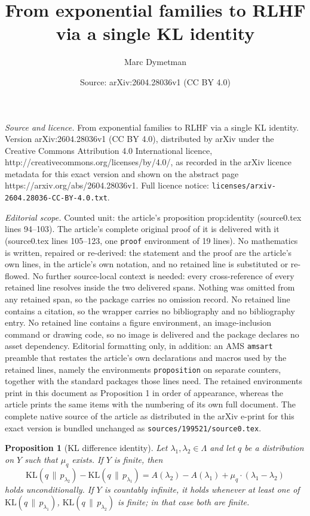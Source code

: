\documentclass[10pt,a4paper]{amsart}
\title{From exponential families to RLHF via a single KL identity}
\author{Marc Dymetman}
\date{Source: arXiv:2604.28036v1 (CC BY 4.0)}
\newtheorem{proposition}{Proposition}
\newcommand{\KL}[2]{\mathrm{KL}\!\left(#1 \,\|\, #2\right)}
\begin{document}
\maketitle

\noindent\emph{Source and licence.} From exponential families to RLHF via a single KL identity. Version arXiv:2604.28036v1 (CC BY 4.0), distributed by arXiv under the Creative Commons Attribution 4.0 International licence, http://creativecommons.org/licenses/by/4.0/, as recorded in the arXiv licence metadata for this exact version and shown on the abstract page https://arxiv.org/abs/2604.28036v1. Full licence notice: \texttt{licenses/arxiv-2604.28036-CC-BY-4.0.txt}.\par\smallskip

\noindent\textit{Editorial scope.} Counted unit: the article's proposition prop:identity (source0.tex lines 94--103). The article's complete original proof of it is delivered with it (source0.tex lines 105--123, one \texttt{proof} environment of 19 lines). No mathematics is written, repaired or re-derived: the statement and the proof are the article's own lines, in the article's own notation, and no retained line is substituted or re-flowed.  No further source-local context is needed: every cross-reference of every retained line resolves inside the two delivered spans.  Nothing was omitted from any retained span, so the package carries no omission record.  No retained line contains a citation, so the wrapper carries no bibliography and no bibliography entry.  No retained line contains a figure environment, an image-inclusion command or drawing code, so no image is delivered and the package declares no asset dependency.  Editorial formatting only, in addition: an AMS \texttt{amsart} preamble that restates the article's own declarations and macros used by the retained lines, namely the environments \texttt{proposition} on separate counters, together with the standard packages those lines need.  The retained environments print in this document as Proposition 1 in order of appearance, whereas the article prints the same items with the numbering of its own full document.  The complete native source of the article as distributed in the arXiv e-print for this exact version is bundled unchanged as \texttt{sources/199521/source0.tex}.
\begin{proposition}[KL difference identity]\label{prop:identity}
Let $\lambda_1, \lambda_2 \in \Lambda$ and let $q$ be a distribution on $Y$ such that $\mu_q$ exists.
If $Y$ is finite, then
\begin{equation}\label{eq:identity}
    \boxed{\KL{q}{p_{\lambda_2}} - \KL{q}{p_{\lambda_1}}
    = A(\lambda_2) - A(\lambda_1) + \mu_q \cdot (\lambda_1 - \lambda_2)}
\end{equation}
holds unconditionally.
If $Y$ is countably infinite, it holds whenever at least one of $\KL{q}{p_{\lambda_1}}$, $\KL{q}{p_{\lambda_2}}$ is finite; in that case both are finite.
\end{proposition}
\end{document}
